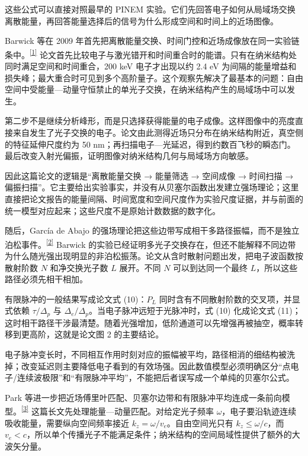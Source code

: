 这些公式可以直接对照最早的 PINEM 实验。它们先回答电子如何从局域场交换离散能量，再回答能量选择后的信号为什么形成空间和时间上的近场图像。

Barwick 等在 2009 年首先把离散能量交换、时间门控和近场成像放在同一实验链条中。\textsuperscript{\hyperref[ch01-ref1]{[1]}}
论文首先比较电子与激光错开和时间重合时的能谱。只有在纳米结构处同时满足空间和时间重合，200 keV 电子才出现以约 2.4 eV 为间隔的能量增益和损失峰；最大重合时可见到多个高阶量子。这个观察先解决了最基本的问题：自由空间中受能量—动量守恒禁止的单光子交换，在纳米结构产生的局域场中可以发生。

第二步不是继续分析峰形，而是只选择获得能量的电子成像。这样图像中的亮度直接来自发生了光子交换的电子。论文由此测得近场只分布在纳米结构附近，真空侧的特征延伸尺度约为 50 nm；再扫描电子—光延迟，得到约数百飞秒的瞬态门。最后改变入射光偏振，证明图像对纳米结构几何与局域场方向敏感。

因此这篇论文的逻辑是“离散能量交换 → 能量筛选 → 空间成像 → 时间扫描 → 偏振扫描”。它主要给出实验事实，并没有从贝塞尔函数出发建立强场理论；这里直接把论文报告的能量间隔、时间宽度和空间尺度作为实验尺度证据，并与前面的统一模型对应起来；这些尺度不是原始计数数据的数字化。


随后，García de Abajo 的强场理论把这些边带写成相干多路径振幅，而不是独立泊松事件。\textsuperscript{\hyperref[ch01-ref2]{[2]}}
Barwick 的实验已经证明多光子交换存在，但还不能解释不同边带为什么随光强出现明显的非泊松振荡。论文从含时散射问题出发，把电子波函数按散射阶数 $N$ 和净交换光子数 $L$ 展开。不同 $N$ 可以到达同一个最终 $L$，所以这些路径必须先相干相加。

有限脉冲的一般结果写成论文式 (10)：$P_L$ 同时含有不同散射阶数的交叉项，并显式依赖 $\tau/\Delta_p$ 与 $\Delta_e/\Delta_p$。当电子脉冲远短于光脉冲时，式 (10) 化成论文式 (11)；这时相干路径干涉最清楚。随着光强增加，低阶通道可以先增强再被抽空，概率转移到更高阶，这就是论文图 2 的主要结论。

电子脉冲变长时，不同相互作用时刻对应的振幅被平均，路径相消的细结构被洗掉；改变延迟则主要降低电子看到的有效场强。因此数值模型必须明确区分“点电子/连续波极限”和“有限脉冲平均”，不能把后者误写成一个单纯的贝塞尔公式。


Park 等进一步把近场傅里叶匹配、贝塞尔边带和有限脉冲平均连成一条前向模型。\textsuperscript{\hyperref[ch01-ref3]{[3]}}
这篇长文先处理能量—动量匹配。对给定光子频率 $\omega$，电子要沿轨迹连续吸收能量，需要纵向空间频率接近 $k_z=\omega/v_e$。自由空间光只有 $k_z\le\omega/c$，而 $v_e<c$，所以单个传播光子不能满足条件；纳米结构的空间局域性提供了额外的大波矢分量。

